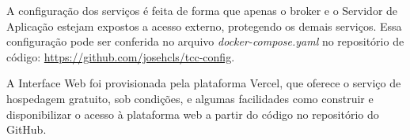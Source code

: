 A configuração dos serviços é feita de forma que apenas o broker e o Servidor de Aplicação estejam expostos a acesso externo, protegendo os demais serviços. Essa configuração pode ser conferida no arquivo \textit{docker-compose.yaml} no repositório de código: \url{https://github.com/josehcls/tcc-config}.


A Interface Web foi provisionada pela plataforma Vercel, que oferece o serviço de hospedagem gratuito, sob condições, e algumas facilidades como construir e disponibilizar o acesso à plataforma web a partir do código no repositório do GitHub.

